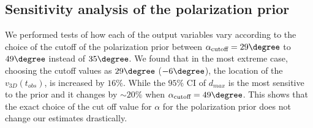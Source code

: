 \subsection{Sensitivity analysis of the polarization prior}
%
\label{sec: sensitivityTests}
We performed tests of how each of the output variables vary according to the
choice of the cutoff of the polarization prior between
$\alpha_{\text{cutoff}} =
29 \degree$ to $49\degree$ instead of $35 \degree$.  
We found that in the most extreme case, choosing the cutoff values as $29
\degree$ ($-6 \degree$), the location of the $v_{3D}(t_{obs})$, is
increased by $ 16 \%$. While the $95\%$ CI of $d_{max}$ is
the most sensitive to the prior and it changes by
$\sim 20 \%$ when $\alpha_{\text{cutoff}} = 49 \degree$. 
This shows that the exact choice of the cut off value for $\alpha$ for the
polarization prior does not change our estimates drastically.
%
%
%
%
%
